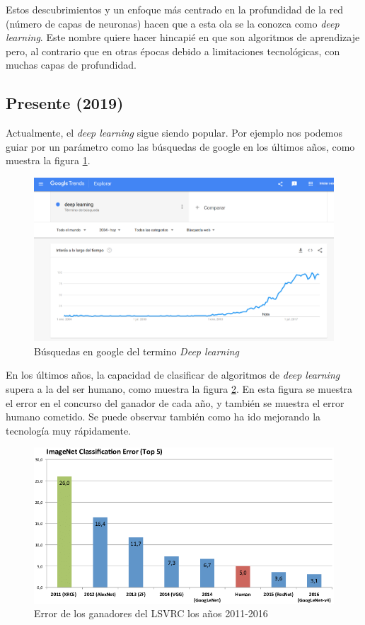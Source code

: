 \documentclass[12pt]{book}
\numberwithin{equation}{section}
\begin{document}
Estos descubrimientos y un enfoque más centrado en la profundidad de la red (número de capas de neuronas) hacen que a esta ola se la conozca como \textit{deep learning}. Este nombre quiere hacer hincapié en que son algoritmos de aprendizaje pero, al contrario que en otras épocas debido a limitaciones tecnológicas, con muchas capas de profundidad.

\subsection{Presente (2019)}

Actualmente, el \textit{deep learning} sigue siendo popular. Por ejemplo nos podemos guiar por un parámetro como las búsquedas de google en los últimos años, como muestra la figura \ref{fig:growth}.

\begin{figure}[h]
    \centering
    \includegraphics[width=1\textwidth]{growth.png}
    \caption{Búsquedas en google del termino \textit{Deep learning}}
    \label{fig:growth}
\end{figure}

En los últimos años, la capacidad de clasificar de algoritmos de \textit{deep learning} supera a la del ser humano\cite{DBLP:journals/corr/YangH15}, como muestra la figura \ref{fig:errorLSVRC}. En esta figura se muestra el error en el concurso del ganador de cada año, y también se muestra el error humano cometido. Se puede observar también como ha ido mejorando la tecnología muy rápidamente.


\begin{figure}[h]
    \centering
    \includegraphics[width=1\textwidth]{Winner-results-of-the-ImageNet-large-scale-visual-recognition-challenge-LSVRC-of-the.png}
    \caption{Error de los ganadores del LSVRC los años 2011-2016}
    \label{fig:errorLSVRC}
\end{figure}
\end{document}

